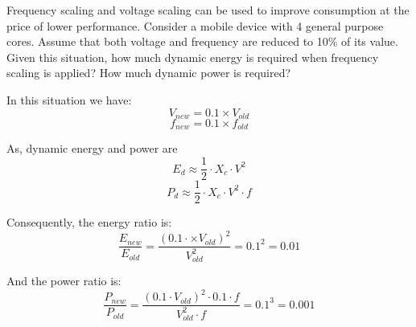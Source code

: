 \begin{acexercise}
\end{acexercise}

Frequency scaling and voltage scaling can be used to improve consumption at the
price of lower performance. Consider a mobile device with 4 general purpose
cores.  Assume that both voltage and frequency are reduced to 10\%
of its value.  Given this situation, how much dynamic energy is required when
frequency scaling is applied? How much dynamic power is required?

\begin{acsolution}
\end{acsolution}

In this situation we have:
\[V_{new} = 0.1 \times V_{old}\]
\[f_{new} = 0.1 \times f_{old}\]

As, dynamic energy and power are
\[
E_d \approx \frac{1}{2} \cdot X_c \cdot V^2
\]
\[
P_d \approx \frac{1}{2} \cdot X_c \cdot V^2 \cdot f
\]

Consequently, the energy ratio is:
\[
\frac{E_{new}}{E_{old}} =
\frac{(0.1 \cdot \times V_{old})^2}{V_{old}^2} =
0.1^2 =
0.01
\] 

And the power ratio is:
\[
\frac{P_{new}}{P_{old}} =
\frac{(0.1 \cdot V_{old})^2 \cdot 0.1 \cdot f}{V_{old}^2 \cdot f} =
0.1^3 =
0.001
\]
